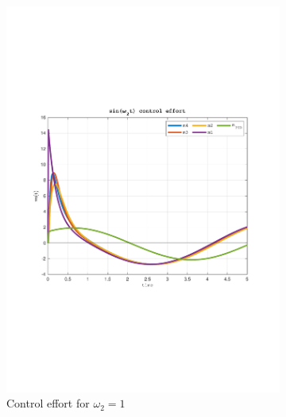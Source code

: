 \documentclass[a4paper, 12pt]{article}
\begin{document}
\begin{figure}[h!]
\begin{subfigure}[t]{0.4\textwidth}
           \includegraphics[width=\textwidth]{Figures/fig07d.pdf}
           \caption{Control effort for $\omega_2 = 1$}
           \label{fig:fig07d}
       \end{subfigure}
       \begin{subfigure}[t]{0.60\textwidth}

\end{subfigure}
\end{figure}
\end{document}

